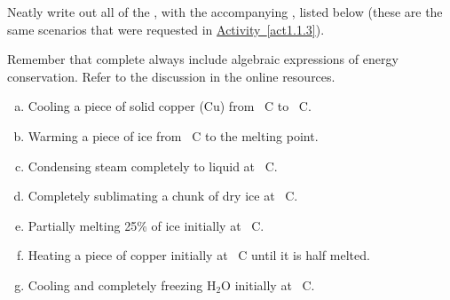 \label{FNT1.1.3-1}

Neatly write out all of the \EnergyDiagrams{}, with the accompanying \TempGraphs{}, listed below (these are the same scenarios that were requested in \hyperref[act1.1.3]{Activity~\ref*{act1.1.3}}).

Remember that complete \EnergyDiagrams{} always include algebraic expressions of energy conservation. Refer to the \EnergyInteractionModel{} discussion in the online resources.

\begin{enumerate}[(a)]
	\item Cooling a piece of solid copper (Cu) from \unit[500]{\textdegree C} to \unit[350]{\textdegree C}.
	\item Warming a piece of ice from \unit[-20]{\textdegree C} to the melting point.
	\item Condensing steam completely to liquid at \unit[100]{\textdegree C}.
	\item Completely sublimating a chunk of dry ice at \unit[-79]{\textdegree C}.
	\item Partially melting 25\% of ice initially at \unit[0]{\textdegree C}.
	\item Heating a piece of copper initially at \unit[300]{\textdegree C} until it is half melted.
	\item Cooling and completely freezing H$_2$O initially at \unit[80]{\textdegree C}.
\end{enumerate}

